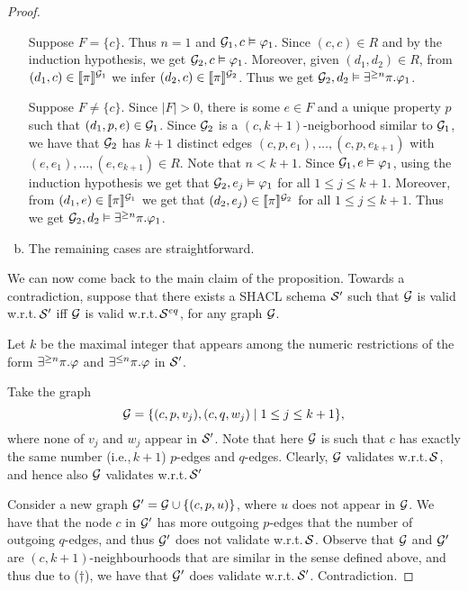 \begin{proof}
\begin{enumerate}[(a)]
  \medskip
  Suppose $F=\{c\}$. Thus $n=1$ and $\mathcal{G}_1,c\vDash\varphi_1$. Since $(c,c)\in R$ and by the induction hypothesis, we get $\mathcal{G}_2,c\vDash\varphi_1 $. Moreover, given $(d_1,d_2)\in R$, from  $(d_1,c)\in \llbracket{\pi}\rrbracket^{\mathcal{G}_1}$ we infer $(d_2,c)\in \llbracket{\pi}\rrbracket^{\mathcal{G}_2}$. Thus we get   
   $\mathcal{G}_2,d_2\vDash \exists^{\geq n}\pi.{\varphi_1}$.

\medskip
  Suppose $F\neq \{c\}$. Since $|F|>0$, there is some $e\in F$ and a unique property $p$ such that $(d_1,p,e)\in \mathcal{G}_1$. Since $\mathcal{G}_2$ is a $(c,k+1)$-neigborhood similar to $\mathcal{G}_1$, we have that $\mathcal{G}_2$ has $k+1$ distinct edges $(c,p,e_1),\ldots,(c,p,e_{k+1})$ with $(e,e_1),\ldots,(e,e_{k+1})\in R$. Note that $n<k+1$. Since $\mathcal{G}_1,e\vDash\varphi_1$, using the induction hypothesis we get that $\mathcal{G}_2,e_j\vDash\varphi_1$ for all $1 \leq j \leq k+1$. Moreover, from $(d_1,e)\in \llbracket{\pi}\rrbracket^{\mathcal{G}_1}$ we get that  
$(d_2,e_j)\in \llbracket{\pi}\rrbracket^{\mathcal{G}_2}$ for all  $1 \leq j \leq k+1$. Thus we get   
   $\mathcal{G}_2,d_2\vDash \exists^{\geq n}\pi.{\varphi_1}$.  
 \item The remaining cases are straightforward.  
\end{enumerate}



We can now come back to the main claim of the proposition. %
Towards a contradiction, suppose that there exists a SHACL schema $\mathcal{S}'$ such that $\mathcal{G}$ is valid w.r.t.\,$\mathcal{S}'$ iff $\mathcal{G}$ is valid w.r.t.\,$\mathcal{S}^{eq}$, for any graph $\mathcal{G}$. 

Let $k$ be the maximal integer that appears among the numeric restrictions of the form  $\exists^{\geq n}\pi.{\varphi}$ and $\exists^{\leq n}\pi.{\varphi}$ in $\mathcal{S}'$.

Take the graph
\[\mathcal{G}=\{(c,p,v_j),(c,q,w_j)\mid 1 \leq j \leq k+1\},\]
where none of $v_j$ and $w_j$ appear in $\mathcal{S}'$.
Note that here $\mathcal{G}$ is such that  $c$ has exactly the same number (i.e.,\,$k+1$) $p$-edges and $q$-edges. Clearly, $\mathcal{G}$ validates w.r.t.\,$\mathcal{S}$, and hence also $\mathcal{G}$ validates w.r.t.\,$\mathcal{S}'$

Consider a new graph $\mathcal{G}'=\mathcal{G}\cup \{(c,p,u) \}$, where $u$ does not appear in $\mathcal{G} $. We have that the node $c$ in  $\mathcal{G}'$ has more outgoing $p$-edges that the number of outgoing $q$-edges, and thus $\mathcal{G}'$ does not validate w.r.t.\,$\mathcal{S}$. Observe that $\mathcal{G}$ and $\mathcal{G}'$ are $(c,k+1)$-neighbourhoods that are similar in the sense defined above, and thus due to ($\dagger$), we have that $\mathcal{G}'$ does validate w.r.t.\,$\mathcal{S}'$. Contradiction. 
   \end{proof}




